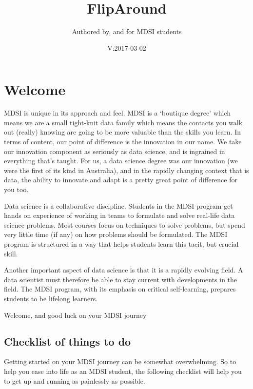 \documentclass[]{book}
\title{FlipAround}
\author{Authored by, and for MDSI students}
\date{V:2017-03-02}
\theoremstyle{definition}
\theoremstyle{definition}
\theoremstyle{remark}
\begin{document}
\maketitle

{
\setcounter{tocdepth}{1}
\tableofcontents
}
\chapter{Welcome}\label{welcome}

MDSI is unique in its approach and feel. MDSI is a `boutique degree'
which means we are a small tight-knit data family which means the
contacts you walk out (really) knowing are going to be more valuable
than the skills you learn. In terms of content, our point of difference
is the innovation in our name. We take our innovation component as
seriously as data science, and is ingrained in everything that's taught.
For us, a data science degree was our innovation (we were the first of
its kind in Australia), and in the rapidly changing context that is
data, the ability to innovate and adapt is a pretty great point of
difference for you too.

Data science is a collaborative discipline. Students in the MDSI program
get hands on experience of working in teams to formulate and solve
real-life data science problems. Most courses focus on techniques to
solve problems, but spend very little time (if any) on how problems
should be formulated. The MDSI program is structured in a way that helps
students learn this tacit, but crucial skill.

Another important aspect of data science is that it is a rapidly
evolving field. A data scientist must therefore be able to stay current
with developments in the field. The MDSI program, with its emphasis on
critical self-learning, prepares students to be lifelong learners.

Welcome, and good luck on your MDSI journey

\section{Checklist of things to do}\label{checklist-of-things-to-do}

Getting started on your MDSI journey can be somewhat overwhelming. So to
help you ease into life as an MDSI student, the following checklist will
help you to get up and running as painlessly as possible.
\end{document}
